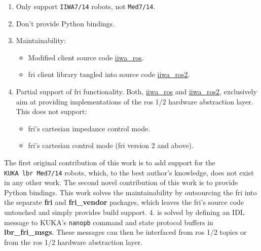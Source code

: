 \begin{enumerate}
\def\labelenumi{\arabic{enumi}.}
\item
  Only support \texttt{IIWA7/14} robots, not \texttt{Med7/14}.
\item
  Don't provide Python bindings.
\item
  Maintainability:

  \begin{itemize}
  \item
    Modified client source code
    \href{https://github.com/epfl-lasa/iiwa_ros}{iiwa\_ros}.
  \item
    \acrshort{fri} client library tangled into source code
    \href{https://github.com/ICube-Robotics/iiwa_ros2}{iiwa\_ros2}.
  \end{itemize}
\item
  Partial support of \acrshort{fri} functionality. Both,
  \href{https://github.com/epfl-lasa/iiwa_ros}{iiwa\_ros} and
  \href{https://github.com/ICube-Robotics/iiwa_ros2}{iiwa\_ros2},
  exclusively aim at providing implementations of the \acrshort{ros} 1/2 hardware
  abstraction layer. This does not support:

  \begin{itemize}
  \item
    \acrshort{fri}'s cartesian impedance control mode.
  \item
    \acrshort{fri}'s cartesian control mode (\acrshort{fri} version 2 and above).
  \end{itemize}
\end{enumerate}

The first original contribution of this work is to add support for the
\texttt{KUKA\ \acrshort{lbr}\ Med7/14} robots, which, to the best author's
knowledge, does not exist in any other work. The second novel
contribution of this work is to provide Python bindings. This work
solves the maintainability by outsourcing the \acrshort{fri} into the separate
\textbf{fri} and \textbf{fri\_vendor} packages, which leaves the \acrshort{fri}'s
source code untouched and simply provides build support. 4. is solved by
defining an IDL message to KUKA's \texttt{nanopb} command and state
protocol buffers in \textbf{lbr\_fri\_msgs}. These messages can then be
interfaced from \acrshort{ros} 1/2 topics or from the \acrshort{ros} 1/2 hardware abstraction
layer.

